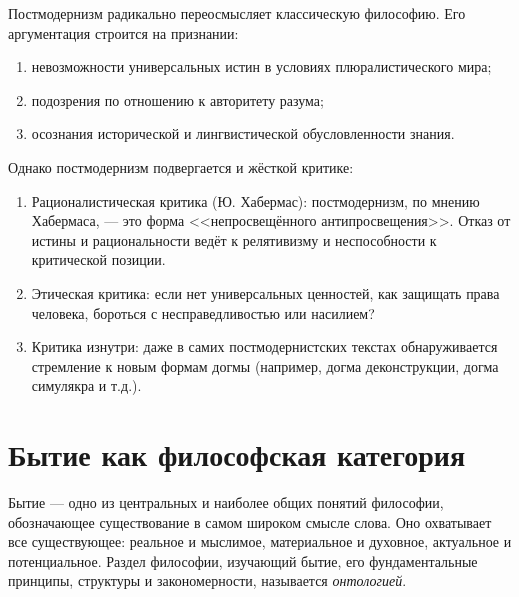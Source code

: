 \documentclass[12pt,a4paper]{article}
\begin{document}
	Постмодернизм радикально переосмысляет классическую философию. Его аргументация строится на признании:
	\begin{enumerate}
		\item 	невозможности универсальных истин в условиях плюралистического мира;
		\item подозрения по отношению к авторитету разума;
		\item осознания исторической и лингвистической обусловленности знания.
	\end{enumerate}
	
	Однако постмодернизм подвергается и жёсткой критике:
	
	\begin{enumerate}
		\item Рационалистическая критика (Ю. Хабермас): постмодернизм, по мнению Хабермаса, — это форма <<непросвещённого антипросвещения>>. Отказ от истины и рациональности ведёт к релятивизму и неспособности к критической позиции.
		
		\item Этическая критика: если нет универсальных ценностей, как защищать права человека, бороться с несправедливостью или насилием?
		
		\item 	Критика изнутри: даже в самих постмодернистских текстах обнаруживается стремление к новым формам догмы (например, догма деконструкции, догма симулякра и т.д.).
		
	\end{enumerate}
	
	\section{Бытие как философская категория~\checkmark}
	
	Бытие — одно из центральных и наиболее общих понятий философии, обозначающее существование в самом широком смысле слова. Оно охватывает все существующее: реальное и мыслимое, материальное и духовное, актуальное и потенциальное. Раздел философии, изучающий бытие, его фундаментальные принципы, структуры и закономерности, называется \textit{онтологией}.
	
\end{document}
